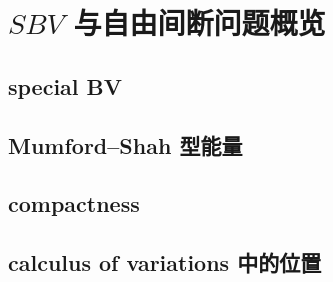 \section{\texorpdfstring{\(SBV\)}{SBV} 与自由间断问题概览}
\label{b1:sec:2804}


\subsection{special BV}
\label{b1:subsec:280401}

\subsection{Mumford–Shah 型能量}
\label{b1:subsec:280402}

\subsection{compactness}
\label{b1:subsec:280403}

\subsection{calculus of variations 中的位置}
\label{b1:subsec:280404}


